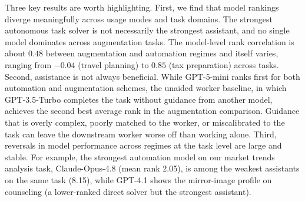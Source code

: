 
Three key results are worth highlighting. First, we find that model rankings diverge meaningfully across usage modes and task domains. The strongest autonomous task solver is not necessarily the strongest assistant, and no single model dominates across augmentation tasks. The model-level rank correlation is about $0.48$ between augmentation and automation regimes and itself varies, ranging from $-0.04$ (travel planning) to $0.85$ (tax preparation) across tasks. Second, assistance is not always beneficial. While GPT-5-mini ranks first for both automation and augmentation schemes, the unaided worker baseline, in which GPT-3.5-Turbo completes the task without guidance from another model, achieves the second best average rank in the augmentation comparison. Guidance that is overly complex, poorly matched to the worker, or miscalibrated to the task can leave the downstream worker worse off than working alone. Third, reversals in model performance across regimes at the task level are large and stable. For example, the strongest automation model on our market trends analysis task, Claude-Opus-4.8 (mean rank 2.05), is among the weakest assistants on the same task (8.15), while GPT-4.1 shows the mirror-image profile on counseling (a lower-ranked direct solver but the strongest assistant).


